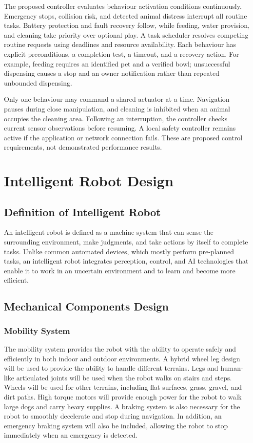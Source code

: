 \documentclass[conference,letterpaper]{IEEEtran}
\begin{document}
The proposed controller evaluates behaviour activation conditions continuously. Emergency stops, collision risk, and detected animal distress interrupt all routine tasks. Battery protection and fault recovery follow, while feeding, water provision, and cleaning take priority over optional play. A task scheduler resolves competing routine requests using deadlines and resource availability. Each behaviour has explicit preconditions, a completion test, a timeout, and a recovery action. For example, feeding requires an identified pet and a verified bowl; unsuccessful dispensing causes a stop and an owner notification rather than repeated unbounded dispensing.

Only one behaviour may command a shared actuator at a time. Navigation pauses during close manipulation, and cleaning is inhibited when an animal occupies the cleaning area. Following an interruption, the controller checks current sensor observations before resuming. A local safety controller remains active if the application or network connection fails. These are proposed control requirements, not demonstrated performance results.

\section{Intelligent Robot Design}

\subsection{Definition of Intelligent Robot}

An intelligent robot is defined as a machine system that can sense the surrounding environment, make judgments, and take actions by itself to complete tasks. Unlike common automated devices, which mostly perform pre-planned tasks, an intelligent robot integrates perception, control, and AI technologies that enable it to work in an uncertain environment and to learn and become more efficient.

\subsection{Mechanical Components Design}

\subsubsection{Mobility System}

The mobility system provides the robot with the ability to operate safely and efficiently in both indoor and outdoor environments. A hybrid wheel leg design will be used to provide the ability to handle different terrains. Legs and human-like articulated joints will be used when the robot walks on stairs and steps. Wheels will be used for other terrains, including flat surfaces, grass, gravel, and dirt paths. High torque motors will provide enough power for the robot to walk large dogs and carry heavy supplies. A braking system is also necessary for the robot to smoothly decelerate and stop during navigation. In addition, an emergency braking system will also be included, allowing the robot to stop immediately when an emergency is detected.
\end{document}
